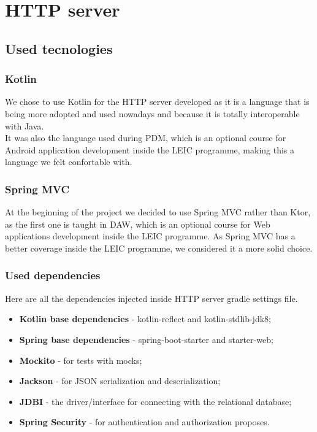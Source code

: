 \section{HTTP server}

\subsection{Used tecnologies}

\subsubsection{Kotlin}

We chose to use Kotlin\cite{kotlin} for the HTTP server developed as it is a language that is being more adopted and used nowadays and because it is totally 
interoperable with Java\cite{java}.\\

It was also the language used during PDM, which is an optional course for Android application development inside the LEIC programme, 
making this a language we felt confortable with.\\

\subsubsection{Spring MVC}

At the beginning of the project we decided to use Spring MVC\cite{springmvc} rather than Ktor\cite{ktor}, as the first one is taught in DAW, which is an optional course
for Web applications development inside the LEIC programme. As Spring MVC has a better coverage inside the LEIC programme, we considered 
it a more solid choice.\\

\subsubsection{Used dependencies}

Here are all the dependencies injected inside HTTP server gradle settings file.\\

\begin{itemize}
    \item \textbf{Kotlin base dependencies} - kotlin-reflect and kotlin-stdlib-jdk8;
    \item \textbf{Spring base dependencies} - spring-boot-starter and starter-web;
    \item \textbf{Mockito} - for tests with mocks;
    \item \textbf{Jackson} - for JSON serialization and deserialization;
    \item \textbf{JDBI} - the driver/interface for connecting with the relational database;
    \item \textbf{Spring Security} - for authentication and authorization proposes.
\end{itemize}


